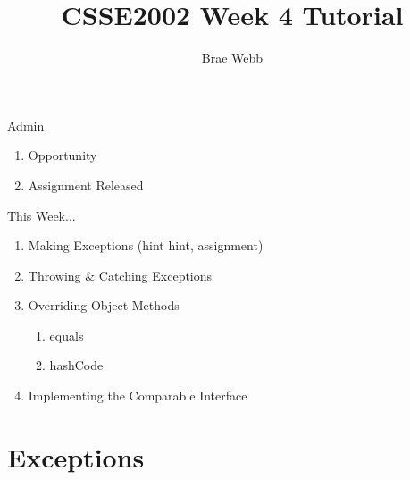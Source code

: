 \documentclass[week4]{csse2002}
\author{Brae Webb}
\title{CSSE2002 Week 4 Tutorial}
\begin{document}
\begin{frame}
\maketitle
\end{frame}

\begin{topic}{Admin}
\begin{enumerate}
    \item Opportunity
    \item Assignment Released
\end{enumerate}
\end{topic}

\begin{topic}{This Week...}
\begin{enumerate}
    \item Making Exceptions (hint hint, assignment)
    \item Throwing \& Catching Exceptions
    \item Overriding Object Methods
    \begin{enumerate}
    	\item equals
    	\item hashCode
    \end{enumerate}
    \item Implementing the Comparable Interface
\end{enumerate}
\end{topic}

\section{Exceptions}
\end{document}
